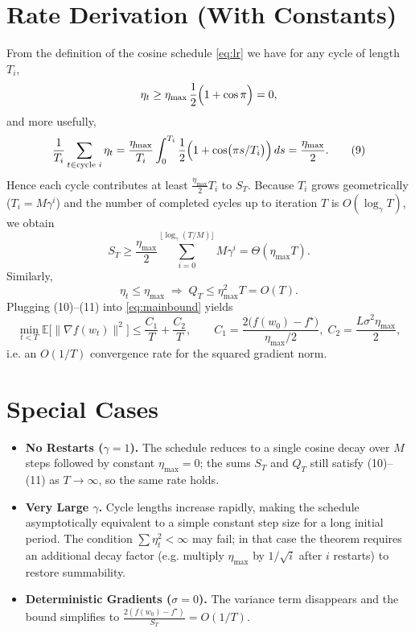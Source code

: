 \documentclass{article}
\begin{document}
\section*{Rate Derivation (With Constants)}
From the definition of the cosine schedule \eqref{eq:lr} we have for any
cycle of length $T_i$,
\[
\eta_t\ge \eta_{\max}\,\frac{1}{2}\Bigl(1+\cos\pi\Bigr)=0,
\]
and more usefully,
\[
\frac{1}{T_i}\sum_{t\in\text{cycle }i}\eta_t
= \frac{\eta_{\max}}{T_i}\int_{0}^{T_i}
\frac{1}{2}\Bigl(1+\cos\bigl(\pi s/T_i\bigr)\Bigr)\,ds
= \frac{\eta_{\max}}{2}.
\tag{9}
\]
Hence each cycle contributes at least $\frac{\eta_{\max}}{2}T_i$ to $S_T$.
Because $T_i$ grows geometrically ($T_i = M\gamma^{i}$) and the number of
completed cycles up to iteration $T$ is $O(\log_{\gamma} T)$, we obtain
\[
S_T \ge \frac{\eta_{\max}}{2}\sum_{i=0}^{\lfloor\log_{\gamma}(T/M)\rfloor}
M\gamma^{i}
= \Theta(\eta_{\max} T).
\tag{10}
\]
Similarly,
\[
\eta_t\le\eta_{\max}\;\Longrightarrow\;
Q_T\le\eta_{\max}^{2} T = O(T).
\tag{11}
\]
Plugging (10)–(11) into \eqref{eq:mainbound} yields
\[
\min_{t<T}\mathbb{E}\!\big[\|\nabla f(w_t)\|^{2}\big]
\le
\frac{C_{1}}{T}+\frac{C_{2}}{T},
\qquad
C_{1}= \frac{2\big(f(w_0)-f^{\star}\big)}{\eta_{\max}/2},
\;
C_{2}= \frac{L\sigma^{2}\eta_{\max}}{2},
\]
i.e. an $O(1/T)$ convergence rate for the squared gradient norm.

\section*{Special Cases}
\begin{itemize}
\item \textbf{No Restarts ($\gamma=1$).}  The schedule reduces to a single
cosine decay over $M$ steps followed by constant $\eta_{\max}=0$;
the sums $S_T$ and $Q_T$ still satisfy (10)–(11) as $T\to\infty$, so the same
rate holds.
\item \textbf{Very Large $\gamma$.}  Cycle lengths increase rapidly, making the
schedule asymptotically equivalent to a simple constant step size for a long
initial period.  The condition $\sum\eta_t^{2}<\infty$ may fail; in that case
the theorem requires an additional decay factor (e.g. multiply $\eta_{\max}$
by $1/\sqrt{i}$ after $i$ restarts) to restore summability.
\item \textbf{Deterministic Gradients ($\sigma=0$).}  The variance term disappears
and the bound simplifies to $\frac{2(f(w_0)-f^{\star})}{S_T}=O(1/T)$.
\end{itemize}
\end{document}

